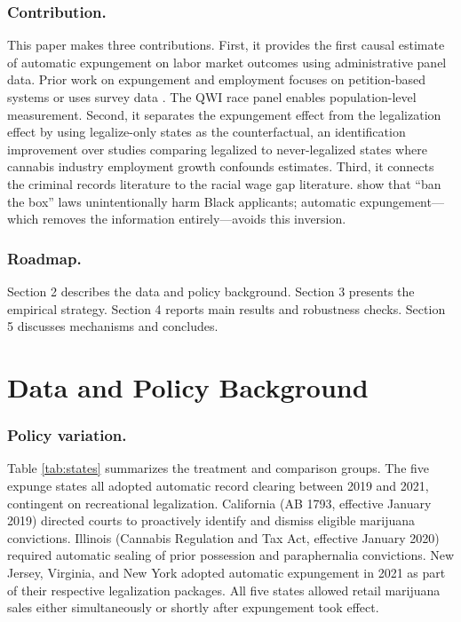 \documentclass[12pt]{article}
\begin{document}
\subsubsection*{Contribution.} This paper makes three contributions. First, it provides the first causal estimate of automatic expungement on labor market outcomes using administrative panel data. Prior work on expungement and employment focuses on petition-based systems \citep{lageson2016digital, doleac2019unintended} or uses survey data \citep{finlay2009effect}. The QWI race panel enables population-level measurement. Second, it separates the expungement effect from the legalization effect by using legalize-only states as the counterfactual, an identification improvement over studies comparing legalized to never-legalized states where cannabis industry employment growth confounds estimates. Third, it connects the criminal records literature to the racial wage gap literature. \citet{aganstarr2018ban} show that ``ban the box'' laws unintentionally harm Black applicants; automatic expungement---which removes the information entirely---avoids this inversion.

\subsubsection*{Roadmap.} Section 2 describes the data and policy background. Section 3 presents the empirical strategy. Section 4 reports main results and robustness checks. Section 5 discusses mechanisms and concludes.

\section{Data and Policy Background}

\subsubsection*{Policy variation.} Table \ref{tab:states} summarizes the treatment and comparison groups. The five expunge states all adopted automatic record clearing between 2019 and 2021, contingent on recreational legalization. California (AB 1793, effective January 2019) directed courts to proactively identify and dismiss eligible marijuana convictions. Illinois (Cannabis Regulation and Tax Act, effective January 2020) required automatic sealing of prior possession and paraphernalia convictions. New Jersey, Virginia, and New York adopted automatic expungement in 2021 as part of their respective legalization packages. All five states allowed retail marijuana sales either simultaneously or shortly after expungement took effect.
\end{document}
